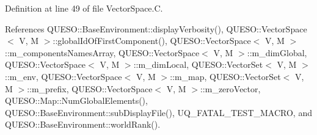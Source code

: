 Definition at line 49 of file Vector\-Space.\-C.



References Q\-U\-E\-S\-O\-::\-Base\-Environment\-::display\-Verbosity(), Q\-U\-E\-S\-O\-::\-Vector\-Space$<$ V, M $>$\-::global\-Id\-Of\-First\-Component(), Q\-U\-E\-S\-O\-::\-Vector\-Space$<$ V, M $>$\-::m\-\_\-components\-Names\-Array, Q\-U\-E\-S\-O\-::\-Vector\-Space$<$ V, M $>$\-::m\-\_\-dim\-Global, Q\-U\-E\-S\-O\-::\-Vector\-Space$<$ V, M $>$\-::m\-\_\-dim\-Local, Q\-U\-E\-S\-O\-::\-Vector\-Set$<$ V, M $>$\-::m\-\_\-env, Q\-U\-E\-S\-O\-::\-Vector\-Space$<$ V, M $>$\-::m\-\_\-map, Q\-U\-E\-S\-O\-::\-Vector\-Set$<$ V, M $>$\-::m\-\_\-prefix, Q\-U\-E\-S\-O\-::\-Vector\-Space$<$ V, M $>$\-::m\-\_\-zero\-Vector, Q\-U\-E\-S\-O\-::\-Map\-::\-Num\-Global\-Elements(), Q\-U\-E\-S\-O\-::\-Base\-Environment\-::sub\-Display\-File(), U\-Q\-\_\-\-F\-A\-T\-A\-L\-\_\-\-T\-E\-S\-T\-\_\-\-M\-A\-C\-R\-O, and Q\-U\-E\-S\-O\-::\-Base\-Environment\-::world\-Rank().


